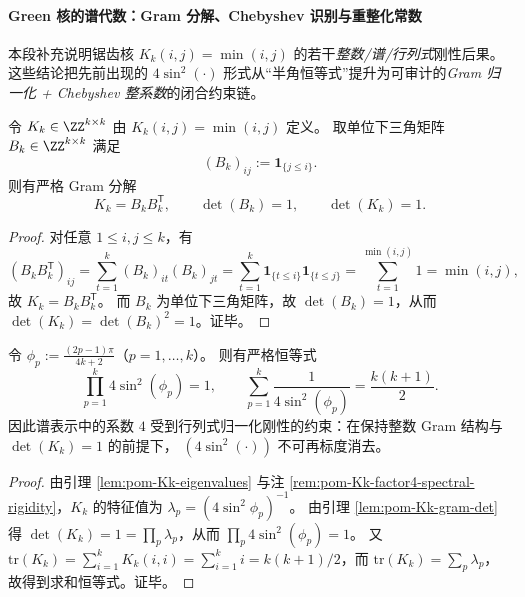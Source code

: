 \paragraph{Green 核的谱代数：Gram 分解、Chebyshev 识别与重整化常数}
本段补充说明锯齿核 \(K_k(i,j)=\min(i,j)\) 的若干\emph{整数/谱/行列式}刚性后果。
这些结论把先前出现的 \(4\sin^2(\cdot)\) 形式从“半角恒等式”提升为可审计的\emph{Gram 归一化 + Chebyshev 整系数}的闭合约束链。

\begin{lemma}\label{lem:pom-Kk-gram-det}
令 \(K_k\in\ZZ^{k\times k}\) 由 \(K_k(i,j)=\min(i,j)\) 定义。
取单位下三角矩阵 \(B_k\in\ZZ^{k\times k}\) 满足
\[
(B_k)_{ij}:=\mathbf{1}_{\{j\le i\}}.
\]
则有严格 Gram 分解
\[
K_k=B_kB_k^{\mathsf T},
\qquad
\det(B_k)=1,
\qquad
\det(K_k)=1.
\]
\end{lemma}
\begin{proof}
对任意 \(1\le i,j\le k\)，有
\[
(B_kB_k^{\mathsf T})_{ij}
=\sum_{t=1}^{k}(B_k)_{it}(B_k)_{jt}
=\sum_{t=1}^{k}\mathbf{1}_{\{t\le i\}}\mathbf{1}_{\{t\le j\}}
=\sum_{t=1}^{\min(i,j)}1
=\min(i,j),
\]
故 \(K_k=B_kB_k^{\mathsf T}\)。
而 \(B_k\) 为单位下三角矩阵，故 \(\det(B_k)=1\)，从而 \(\det(K_k)=\det(B_k)^2=1\)。证毕。
\end{proof}

\begin{corollary}\label{cor:pom-Kk-sine-product-sum}
令
\(
\phi_p:=\frac{(2p-1)\pi}{4k+2}
\)（\(p=1,\dots,k\)）。
则有严格恒等式
\[
\prod_{p=1}^{k}4\sin^2(\phi_p)=1,
\qquad
\sum_{p=1}^{k}\frac{1}{4\sin^2(\phi_p)}=\frac{k(k+1)}{2}.
\]
因此谱表示中的系数 \(4\) 受到行列式归一化刚性的约束：在保持整数 Gram 结构与 \(\det(K_k)=1\) 的前提下，
\((4\sin^2(\cdot))\) 不可再标度消去。
\end{corollary}
\begin{proof}
由引理 \ref{lem:pom-Kk-eigenvalues} 与注 \ref{rem:pom-Kk-factor4-spectral-rigidity}，\(K_k\) 的特征值为
\(
\lambda_p=(4\sin^2\phi_p)^{-1}
\)。
由引理 \ref{lem:pom-Kk-gram-det} 得 \(\det(K_k)=1=\prod_p\lambda_p\)，从而 \(\prod_p 4\sin^2(\phi_p)=1\)。
又 \(\mathrm{tr}(K_k)=\sum_{i=1}^k K_k(i,i)=\sum_{i=1}^k i=k(k+1)/2\)，而 \(\mathrm{tr}(K_k)=\sum_p\lambda_p\)，故得到求和恒等式。证毕。
\end{proof}

